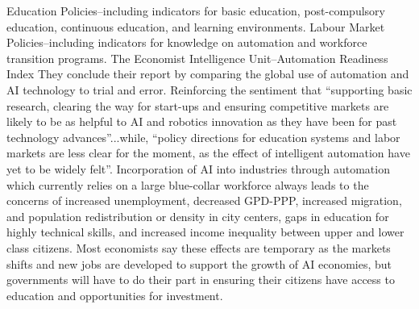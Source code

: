 \documentclass[conference]{IEEEtran}
\begin{document}
Education Policies--including indicators for basic education, post-compulsory education, continuous education, and learning environments.
Labour Market Policies--including indicators for knowledge on automation and workforce transition programs.
The Economist Intelligence Unit--Automation Readiness Index
They conclude their report by comparing the global use of automation and AI technology to trial and error. Reinforcing the sentiment that ``supporting basic research, clearing the way for start-ups and ensuring competitive markets are likely to be as helpful to AI and robotics innovation as they have been for past technology advances''...while, ``policy directions for education systems and labor markets are less clear for the moment, as the effect of intelligent automation have yet to be widely felt''.
Incorporation of AI into industries through automation which currently relies on a large blue-collar workforce always leads to the concerns of increased unemployment, decreased GPD-PPP, increased migration, and population redistribution or density in city centers, gaps in education for highly technical skills, and increased income inequality between upper and lower class citizens. Most economists say these effects are temporary as the markets shifts and new jobs are developed to support the growth of AI economies, but governments will have to do their part in ensuring their citizens have access to education and opportunities for investment.
\end{document}
